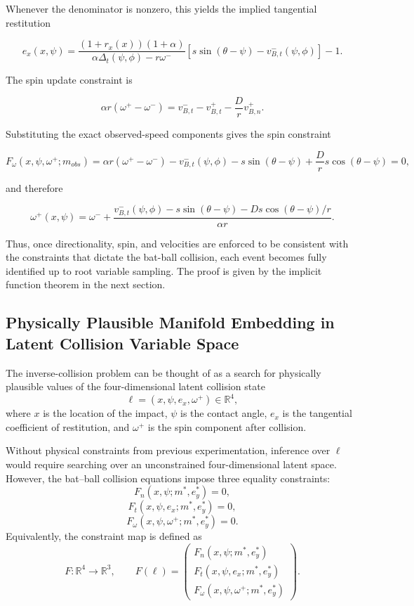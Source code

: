 \documentclass[11pt]{article}
\begin{document}
Whenever the denominator is nonzero, this yields the implied tangential restitution

\begin{equation}
e_x(x, \psi)
=
\frac{(1+r_x(x))(1+\alpha)}
{\alpha\Delta_t(\psi,\phi)-r\omega^-}
\left[
s\sin(\theta-\psi)-v_{B,t}^-(\psi,\phi)
\right]
-
1.
\tag{21}
\end{equation}

The spin update constraint is

\begin{equation}
\alpha r(\omega^+ - \omega^-)
=
v_{B,t}^- - v_{B,t}^+
-
\frac{D}{r}v_{B,n}^+.
\tag{22}
\end{equation}

Substituting the exact observed-speed components gives the spin constraint

\begin{equation}
F_\omega(x, \psi, \omega^+; m_{obs})
=
\alpha r(\omega^+-\omega^-)
-
v_{B,t}^-(\psi,\phi)
-
s\sin(\theta-\psi)
+
\frac{D}{r}s\cos(\theta-\psi)
=
0,
\tag{23}
\end{equation}

and therefore

\begin{equation}
\omega^+(x,\psi)
=
\omega^-
+
\frac{
v_{B,t}^-(\psi,\phi)
-
s\sin(\theta-\psi)
-
Ds\cos(\theta-\psi)/r
}
{\alpha r}.
\tag{24}
\end{equation}

Thus, once directionality, spin, and velocities are enforced to be consistent with the constraints that dictate the bat-ball collision, each event becomes fully identified up to root variable sampling. The proof is given by the implicit function theorem in the next section.

\subsection{Physically Plausible Manifold Embedding in Latent Collision Variable Space}

The inverse-collision problem can be thought of as a search for physically plausible values of the 
four-dimensional latent collision state
\[
\ell
=
(x,\psi,e_x,\omega^{+})
\in \mathbb{R}^4,
\]
where $x$ is the location of the impact, $\psi$ is the contact angle, $e_x$ is the tangential 
coefficient of restitution, and $\omega^{+}$ is the spin component after collision. 

Without physical constraints from previous experimentation, inference over $\ell$ would require searching over an
unconstrained four-dimensional latent space. However, the bat--ball collision
equations impose three equality constraints:
\[
F_n(x,\psi;m^{\ast},e_y^{\ast}) = 0,
\]
\[
F_t(x,\psi,e_x;m^{\ast},e_y^{\ast}) = 0,
\]
\[
F_{\omega}(x,\psi,\omega^{+};m^{\ast},e_y^{\ast}) = 0.
\]
Equivalently, the constraint map is defined as
\[
F:
\mathbb{R}^4
\rightarrow
\mathbb{R}^3,
\qquad
F(\ell)
=
\begin{pmatrix}
F_n(x,\psi;m^{\ast},e_y^{\ast}) \\
F_t(x,\psi,e_x;m^{\ast},e_y^{\ast}) \\
F_{\omega}(x,\psi,\omega^{+};m^{\ast},e_y^{\ast})
\end{pmatrix}.
\]
\end{document}
